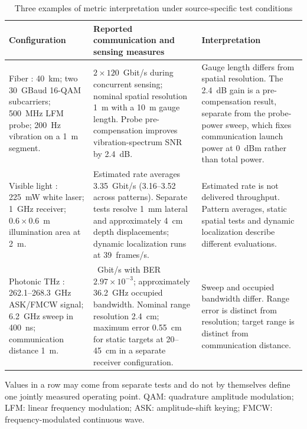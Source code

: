 \begin{table}[!t]
\caption{Three examples of metric interpretation under source-specific test conditions}
\label{tab:section2_quantitative_examples}
\centering
\footnotesize
\setlength{\tabcolsep}{5pt}
\renewcommand{\arraystretch}{1.12}
\begin{tabularx}{\textwidth}{@{}>{\raggedright\arraybackslash}p{}
>{\raggedright\arraybackslash}p{}>{\raggedright\arraybackslash}X@{}}
\toprule
\textbf{Configuration} & \textbf{Reported communication and sensing measures} & \textbf{Interpretation} \\
\midrule
Fiber \cite{OISAC_SCR00057}: 40~km; two 30~GBaud 16-QAM subcarriers;
500~MHz LFM probe; 200~Hz vibration on a 1~m segment. &
$2\times120$~Gbit/s during concurrent sensing; nominal spatial resolution
1~m with a 10~m gauge length. Probe pre-compensation improves vibration-spectrum
SNR by 2.4~dB. &
Gauge length differs from spatial resolution. The 2.4~dB gain is a
pre-compensation result, separate from the probe-power sweep, which fixes
communication launch power at 0~dBm rather than total power. \\
\addlinespace[4pt]
Visible light \cite{OISAC_SCR00196}: 225~mW white laser; 1~GHz receiver;
$0.6\times0.6$~m illumination area at 2~m. &
Estimated rate averages 3.35~Gbit/s (3.16--3.52 across patterns).
Separate tests resolve 1~mm lateral and approximately 4~cm depth displacements;
dynamic localization runs at 39~frames/s. &
Estimated rate is not delivered throughput. Pattern averages, static spatial
tests and dynamic localization describe different evaluations. \\
\addlinespace[4pt]
Photonic THz \cite{OISAC_SCR00083}: 262.1--268.3~GHz ASK/FMCW signal;
6.2~GHz sweep in 400~ns; communication distance 1~m. &
15~Gbit/s with BER $2.97\times10^{-3}$; approximately 36.2~GHz occupied
bandwidth. Nominal range resolution 2.4~cm; maximum error 0.55~cm for static
targets at 20--45~cm in a separate receiver configuration. &
Sweep and occupied bandwidth differ. Range error is distinct from resolution;
target range is distinct from communication distance. \\
\bottomrule
\end{tabularx}
\vspace{3pt}
\parbox{\textwidth}{\footnotesize Values in a row may come from separate tests
and do not by themselves define one jointly measured operating point.
QAM: quadrature amplitude modulation; LFM: linear frequency modulation;
ASK: amplitude-shift keying; FMCW: frequency-modulated continuous wave.}
\end{table}

